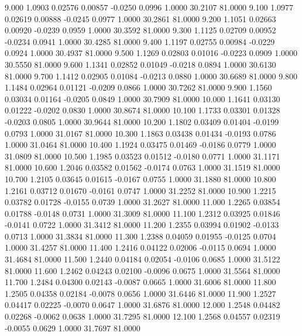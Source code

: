    9.000   1.0903   0.02576   0.00857  -0.0250   0.0996   1.0000  30.2107  81.0000
   9.100   1.0977   0.02619   0.00888  -0.0245   0.0977   1.0000  30.2861  81.0000
   9.200   1.1051   0.02663   0.00920  -0.0239   0.0959   1.0000  30.3592  81.0000
   9.300   1.1125   0.02709   0.00952  -0.0234   0.0941   1.0000  30.4285  81.0000
   9.400   1.1197   0.02755   0.00984  -0.0229   0.0924   1.0000  30.4937  81.0000
   9.500   1.1269   0.02803   0.01016  -0.0223   0.0909   1.0000  30.5550  81.0000
   9.600   1.1341   0.02852   0.01049  -0.0218   0.0894   1.0000  30.6130  81.0000
   9.700   1.1412   0.02905   0.01084  -0.0213   0.0880   1.0000  30.6689  81.0000
   9.800   1.1484   0.02964   0.01121  -0.0209   0.0866   1.0000  30.7262  81.0000
   9.900   1.1560   0.03034   0.01164  -0.0205   0.0849   1.0000  30.7909  81.0000
  10.000   1.1641   0.03130   0.01222  -0.0202   0.0830   1.0000  30.8674  81.0000
  10.100   1.1733   0.03301   0.01328  -0.0203   0.0805   1.0000  30.9644  81.0000
  10.200   1.1802   0.03409   0.01404  -0.0199   0.0793   1.0000  31.0167  81.0000
  10.300   1.1863   0.03438   0.01434  -0.0193   0.0786   1.0000  31.0464  81.0000
  10.400   1.1924   0.03475   0.01469  -0.0186   0.0779   1.0000  31.0809  81.0000
  10.500   1.1985   0.03523   0.01512  -0.0180   0.0771   1.0000  31.1171  81.0000
  10.600   1.2046   0.03582   0.01562  -0.0174   0.0763   1.0000  31.1519  81.0000
  10.700   1.2105   0.03645   0.01615  -0.0167   0.0755   1.0000  31.1880  81.0000
  10.800   1.2161   0.03712   0.01670  -0.0161   0.0747   1.0000  31.2252  81.0000
  10.900   1.2215   0.03782   0.01728  -0.0155   0.0739   1.0000  31.2627  81.0000
  11.000   1.2265   0.03854   0.01788  -0.0148   0.0731   1.0000  31.3009  81.0000
  11.100   1.2312   0.03925   0.01846  -0.0141   0.0722   1.0000  31.3412  81.0000
  11.200   1.2355   0.03994   0.01902  -0.0133   0.0713   1.0000  31.3834  81.0000
  11.300   1.2388   0.04059   0.01955  -0.0125   0.0704   1.0000  31.4257  81.0000
  11.400   1.2416   0.04122   0.02006  -0.0115   0.0694   1.0000  31.4684  81.0000
  11.500   1.2440   0.04184   0.02054  -0.0106   0.0685   1.0000  31.5122  81.0000
  11.600   1.2462   0.04243   0.02100  -0.0096   0.0675   1.0000  31.5564  81.0000
  11.700   1.2484   0.04300   0.02143  -0.0087   0.0665   1.0000  31.6006  81.0000
  11.800   1.2505   0.04358   0.02184  -0.0078   0.0656   1.0000  31.6446  81.0000
  11.900   1.2527   0.04417   0.02225  -0.0070   0.0647   1.0000  31.6876  81.0000
  12.000   1.2548   0.04482   0.02268  -0.0062   0.0638   1.0000  31.7295  81.0000
  12.100   1.2568   0.04557   0.02319  -0.0055   0.0629   1.0000  31.7697  81.0000
